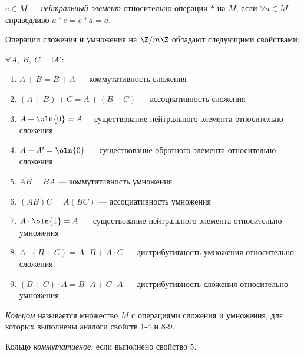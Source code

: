 \begin{defn}
    $e \in M$ --- \emph{нейтральный элемент} относительно операции $*$ на $M$, если $\forall a \in M$ справедливо $a * e = e * a = a$.
\end{defn}

\begin{theorem-non}
    Операции сложения и умножения на $\Z/m\Z$ обладают следующими свойствами:
\end{theorem-non}

$\forall A,~B,~C \quad \exists A'$:
\begin{enumerate}
    \item $A + B = B + A$ --- коммутативность сложения
    
    \item $(A + B) + C = A + (B + C)$ --- ассоциативность сложения
    
    \item $A + \oln{0} = A$--- существование нейтрального элемента относительно сложения
    
    \item $A + A' = \oln{0}$ --- существование обратного элемента относительно сложения
    
    \item $AB = BA$ --- коммутативность умножения
    
    \item $(AB)C = A(BC)$ --- ассоциативность умножения
    
    \item $A \cdot \oln{1} = A$ --- существование нейтрального элемента относительно умножения
    
    \item $A \cdot (B + C) = A \cdot B + A \cdot C$ --- дистрибутивность умножения относительно сложения.
    
    \item $(B + C) \cdot A = B \cdot A + C \cdot A$ --- дистрибутивность сложения относительно умножения.
\end{enumerate}

\begin{defn}
    \emph{Кольцом} называется множество $M$ с операциями сложения и умножения, для которых выполнены аналоги свойств 1-4 и 8-9.
\end{defn}

\begin{defn}
    Кольцо \emph{коммутативное}, если выполнено свойство 5.
\end{defn}

